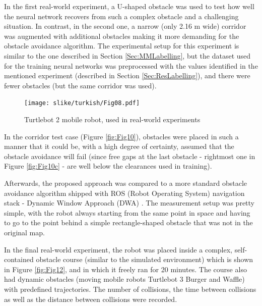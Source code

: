 In the first real-world experiment, a U-shaped obstacle was used to test how well the neural network recovers from such a complex obstacle and a challenging situation. In contrast, in the second one, a narrow (only 2.16 m wide) corridor was augmented with additional obstacles making it more demanding for the obstacle avoidance algorithm. The experimental setup for this experiment is similar to the one described in Section \ref{Sec:MMLabelling}, but the dataset used for the training neural networks was preprocessed with the values identified in the mentioned experiment (described in Section \ref{Sec:ResLabelling}), and there were fewer obstacles (but the same corridor was used).

\begin{figure}
    \centering
    \texttt{[image: slike/turkish/Fig08.pdf]}
    \caption{Turtlebot 2 mobile robot, used in real-world experiments}
    \label{fig:Fig08}
\end{figure}

In the corridor test case (Figure \ref{fig:Fig10}), obstacles were placed in such a manner that it could be, with a high degree of certainty, assumed that the obstacle avoidance will fail (since free gaps at the last obstacle - rightmost one in Figure \ref{fig:Fig10c} - are well below the clearances used in training).

Afterwards, the proposed approach was compared to a more standard obstacle avoidance algorithm shipped with ROS (Robot Operating System) \cite{Quigley2009} navigation stack - Dynamic Window Approach (DWA) \cite{Fox1997}. The measurement setup was pretty simple, with the robot always starting from the same point in space and having to go to the point behind a simple rectangle-shaped obstacle that was not in the original map.

In the final real-world experiment, the robot was placed inside a complex, self-contained obstacle course (similar to the simulated environment) which is shown in Figure \ref{fig:Fig12}, and in which it freely ran for 20 minutes. The course also had dynamic obstacles (moving mobile robots Turtlebot 3 Burger and Waffle) with predefined trajectories. The number of collisions, the time between collisions as well as the distance between collisions were recorded. 

